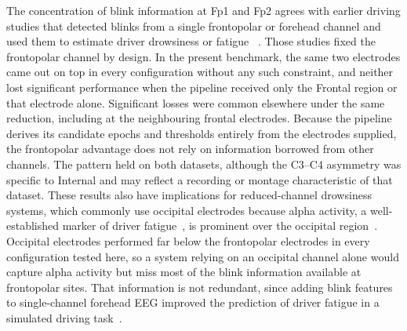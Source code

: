 The concentration of blink information at Fp1 and Fp2 agrees with earlier driving studies that detected blinks from a single frontopolar or forehead channel and used them to estimate driver drowsiness or fatigue
~\citep{ko2020eyeblink,shahbakhti2022simultaneous,shahbakhti2023fusion}.
Those studies fixed the frontopolar channel by design. In the present benchmark, the same two electrodes came out on top in every configuration without any such constraint, and neither lost significant performance when the pipeline received only the Frontal region or that electrode alone. Significant losses were common elsewhere under the same reduction, including at the neighbouring frontal electrodes. Because the pipeline derives its candidate epochs and thresholds entirely from the electrodes supplied, the frontopolar advantage does not rely on information borrowed from other channels. The pattern held on both datasets, although the C3--C4 asymmetry was specific to Internal and may reflect a recording or montage characteristic of that dataset. These results also have implications for reduced-channel drowsiness systems, which commonly use occipital electrodes because alpha activity, a well-established marker of driver fatigue~\citep{simon2011eeg}, is prominent over the occipital region~\citep{lin2014wireless,li2015context}. Occipital electrodes performed far below the frontopolar electrodes in every configuration tested here, so a system relying on an occipital channel alone would capture alpha activity but miss most of the blink information available at frontopolar sites. That information is not redundant, since adding blink features to single-channel forehead EEG improved the prediction of driver fatigue in a simulated driving task~\citep{ko2020eyeblink}.
